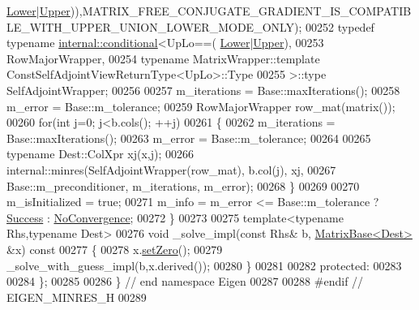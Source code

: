 \begin{DoxyCode}
      \hyperlink{group__enums_gga39e3366ff5554d731e7dc8bb642f83cda891792b8ed394f7607ab16dd716f60e6}{Lower}|\hyperlink{group__enums_gga39e3366ff5554d731e7dc8bb642f83cda6bcb58be3b8b8ec84859ce0c5ac0aaec}{Upper})),MATRIX\_FREE\_CONJUGATE\_GRADIENT\_IS\_COMPATIBLE\_WITH\_UPPER\_UNION\_LOWER\_MODE\_ONLY);
00252             \textcolor{keyword}{typedef} \textcolor{keyword}{typename} \hyperlink{struct_eigen_1_1internal_1_1conditional}{internal::conditional}<UpLo==(
      \hyperlink{group__enums_gga39e3366ff5554d731e7dc8bb642f83cda891792b8ed394f7607ab16dd716f60e6}{Lower}|\hyperlink{group__enums_gga39e3366ff5554d731e7dc8bb642f83cda6bcb58be3b8b8ec84859ce0c5ac0aaec}{Upper}),
00253                                                   RowMajorWrapper,
00254                                                   \textcolor{keyword}{typename} MatrixWrapper::template 
      ConstSelfAdjointViewReturnType<UpLo>::Type
00255                                             >::type SelfAdjointWrapper;
00256 
00257             m\_iterations = Base::maxIterations();
00258             m\_error = Base::m\_tolerance;
00259             RowMajorWrapper row\_mat(matrix());
00260             \textcolor{keywordflow}{for}(\textcolor{keywordtype}{int} j=0; j<b.cols(); ++j)
00261             \{
00262                 m\_iterations = Base::maxIterations();
00263                 m\_error = Base::m\_tolerance;
00264                 
00265                 \textcolor{keyword}{typename} Dest::ColXpr xj(x,j);
00266                 internal::minres(SelfAdjointWrapper(row\_mat), b.col(j), xj,
00267                                  Base::m\_preconditioner, m\_iterations, m\_error);
00268             \}
00269             
00270             m\_isInitialized = \textcolor{keyword}{true};
00271             m\_info = m\_error <= Base::m\_tolerance ? \hyperlink{group__enums_gga85fad7b87587764e5cf6b513a9e0ee5ea52581b035f4b59c203b8ff999ef5fcea}{Success} : 
      \hyperlink{group__enums_gga85fad7b87587764e5cf6b513a9e0ee5eaba1c8763d1179778070f365ecc4157a8}{NoConvergence};
00272         \}
00273         
00275         \textcolor{keyword}{template}<\textcolor{keyword}{typename} Rhs,\textcolor{keyword}{typename} Dest>
00276         \textcolor{keywordtype}{void} \_solve\_impl(\textcolor{keyword}{const} Rhs& b, \hyperlink{group___core___module_class_eigen_1_1_matrix_base}{MatrixBase<Dest>} &x)\textcolor{keyword}{ const}
00277 \textcolor{keyword}{        }\{
00278             x.\hyperlink{group___core___module_ac74411ddeea2545bf20baf14613be47e}{setZero}();
00279             \_solve\_with\_guess\_impl(b,x.derived());
00280         \}
00281         
00282     \textcolor{keyword}{protected}:
00283         
00284     \};
00285 
00286 \} \textcolor{comment}{// end namespace Eigen}
00287 
00288 \textcolor{preprocessor}{#endif // EIGEN\_MINRES\_H}
00289 
\end{DoxyCode}

